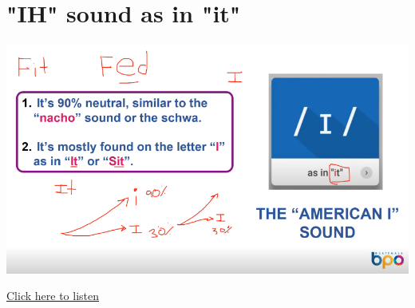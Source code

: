 \section{"IH" sound as in "it" \textipa{\textsci}}
\begin{center}
\includegraphics[width=1\textwidth]{images/american_i_portrait.png}
\end{center}

\href{https://drive.google.com/file/d/1BrgaAhXer2RCPNKEfkW6TGB4dQ94Lbvl/view?usp=sharing}{Click here to listen}

